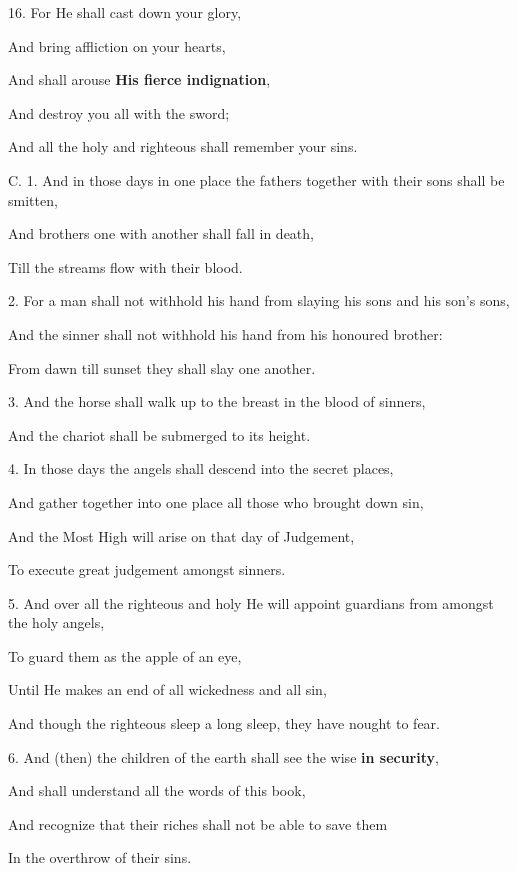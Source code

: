 16. For He shall cast down your glory,

And bring affliction on your hearts,

And shall arouse \textbf{His fierce indignation},

And destroy you all with the sword;

And all the holy and righteous shall remember your sins.


C. 1. And in those days in one place the fathers together with their sons shall be smitten,

And brothers one with another shall fall in death,

Till the streams flow with their blood.

2. For a man shall not withhold his hand from slaying his sons and his son’s sons,

And the sinner shall not withhold his hand from his honoured brother:

From dawn till sunset they shall slay one another.

3. And the horse shall walk up to the breast in the blood of sinners,

And the chariot shall be submerged to its height.

4. In those days the angels shall descend into the secret places,

And gather together into one place all those who brought down sin,

And the Most High will arise on that day of Judgement,

To execute great judgement amongst sinners.

5. And over all the righteous and holy He will appoint guardians from amongst the holy angels,

To guard them as the apple of an eye,

Until He makes an end of all wickedness and all sin,

And though the righteous sleep a long sleep, they have nought to fear.

6. And (then) the children of the earth shall see the wise \textbf{in security},

And shall understand all the words of this book,

And recognize that their riches shall not be able to save them

In the overthrow of their sins.

